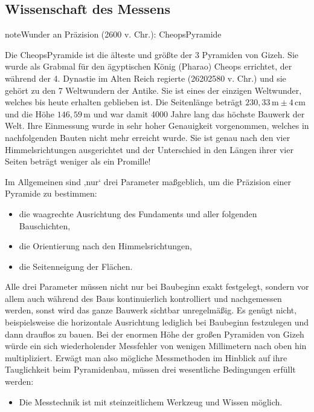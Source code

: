 \documentclass[letterpaper,10pt,english]{jupyterBook}
\begin{document}
\subsection{Wissenschaft des Messens}
\label{\detokenize{content/1_Messen_Einheit:wissenschaft-des-messens}}
\begin{sphinxadmonition}{note}{Wunder an Präzision (2600 v. Chr.): Cheops\sphinxhyphen{}Pyramide}

\sphinxAtStartPar
Die Cheops\sphinxhyphen{}Pyramide ist die älteste und größte der 3 Pyramiden von Gizeh. Sie wurde als Grabmal für den ägyptischen König (Pharao) Cheops errichtet, der während der 4. Dynastie im Alten Reich regierte (2620\sphinxhyphen{}2580 v. Chr.) und sie gehört zu den 7 Weltwundern der Antike. Sie ist eines der einzigen Weltwunder, welches bis heute erhalten geblieben ist.
Die Seitenlänge beträgt \(230,33\,\mathrm m \pm 4\,\mathrm{cm}\) und die Höhe \(146,59\,\mathrm m\) und war damit 4000 Jahre lang das höchste Bauwerk der Welt.
Ihre Einmessung wurde in sehr hoher Genauigkeit vorgenommen, welches in nachfolgenden Bauten nicht mehr erreicht wurde.
Sie ist genau nach den vier Himmelsrichtungen ausgerichtet und der Unterschied in den Längen ihrer vier Seiten beträgt weniger als ein Promille!

\sphinxAtStartPar
Im Allgemeinen sind ‚nur‘ drei Parameter maßgeblich, um die Präzision einer Pyramide zu bestimmen:
\begin{itemize}
\item {} 
\sphinxAtStartPar
die waagrechte Ausrichtung des Fundaments und aller folgenden Bauschichten,

\item {} 
\sphinxAtStartPar
die Orientierung nach den Himmelsrichtungen,

\item {} 
\sphinxAtStartPar
die Seitenneigung der Flächen.

\end{itemize}

\sphinxAtStartPar
Alle drei Parameter müssen nicht nur bei Baubeginn exakt festgelegt, sondern vor allem auch während des Baus kontinuierlich kontrolliert und nachgemessen werden, sonst wird das ganze Bauwerk sichtbar unregelmäßig. Es genügt nicht, beispielsweise die horizontale Ausrichtung lediglich bei Baubeginn festzulegen und dann drauflos zu bauen. Bei der enormen Höhe der großen Pyramiden von Gizeh würde ein sich wiederholender Messfehler von wenigen Millimetern nach oben hin multipliziert.
Erwägt man also mögliche Messmethoden im Hinblick auf ihre Tauglichkeit beim Pyramidenbau, müssen drei wesentliche Bedingungen erfüllt werden:
\begin{itemize}
\item {} 
\sphinxAtStartPar
Die Messtechnik ist mit steinzeitlichem Werkzeug und Wissen möglich.


\end{itemize}
\end{sphinxadmonition}
\end{document}
